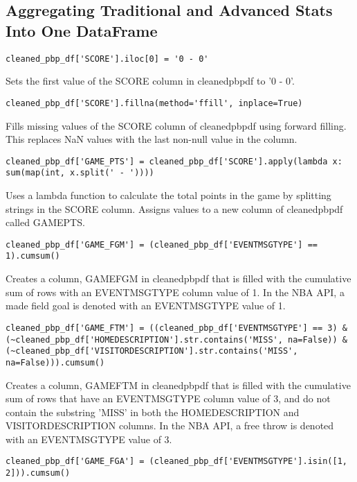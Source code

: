 \documentclass{article}
\begin{document}
\subsection{Aggregating Traditional and Advanced Stats Into One DataFrame}

\begin{lstlisting}
cleaned_pbp_df['SCORE'].iloc[0] = '0 - 0'
\end{lstlisting}
Sets the first value of the SCORE column in cleaned\textunderscore pbp\textunderscore df to '0 - 0'.
\begin{lstlisting}
cleaned_pbp_df['SCORE'].fillna(method='ffill', inplace=True)
\end{lstlisting}
Fills missing values of the SCORE column of cleaned\textunderscore pbp\textunderscore df using forward filling. This replaces NaN values with the last non-null value in the column.
\begin{lstlisting}
cleaned_pbp_df['GAME_PTS'] = cleaned_pbp_df['SCORE'].apply(lambda x: sum(map(int, x.split(' - '))))
\end{lstlisting}
Uses a lambda function to calculate the total points in the game by splitting strings in the SCORE column. Assigns values to a new column of cleaned\textunderscore pbp\textunderscore df called GAME\textunderscore PTS.
\begin{lstlisting}
cleaned_pbp_df['GAME_FGM'] = (cleaned_pbp_df['EVENTMSGTYPE'] == 1).cumsum()
\end{lstlisting}
Creates a column, GAME\textunderscore FGM in cleaned\textunderscore pbp\textunderscore df that is filled with the cumulative sum of rows with an EVENTMSGTYPE column value of 1. In the NBA API, a made field goal is denoted with an EVENTMSGTYPE value of 1.
\begin{lstlisting}
cleaned_pbp_df['GAME_FTM'] = ((cleaned_pbp_df['EVENTMSGTYPE'] == 3) & (~cleaned_pbp_df['HOMEDESCRIPTION'].str.contains('MISS', na=False)) & (~cleaned_pbp_df['VISITORDESCRIPTION'].str.contains('MISS', na=False))).cumsum()
\end{lstlisting}
Creates a column, GAME\textunderscore FTM in cleaned\textunderscore pbp\textunderscore df that is filled with the cumulative sum of rows that have an EVENTMSGTYPE column value of 3, and do not contain the substring 'MISS' in both the HOMEDESCRIPTION and VISITORDESCRIPTION columns. In the NBA API, a free throw is denoted with an EVENTMSGTYPE value of 3.
\begin{lstlisting}
cleaned_pbp_df['GAME_FGA'] = (cleaned_pbp_df['EVENTMSGTYPE'].isin([1, 2])).cumsum()
\end{lstlisting}
\end{document}

